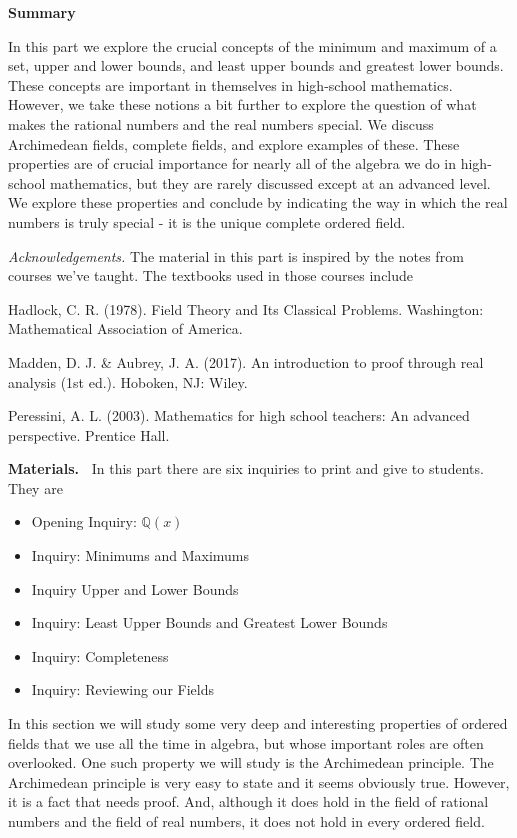 \documentclass[11pt]{article}
\newcommand\header[1]{\vspace*{4pt}\par {\large {\bf #1}}\par}
\newenvironment{bignote}[1][Instructor note]%
	{\begin{mdframed}\raggedright{\bf #1.~}}
	{\end{mdframed}}
\theoremstyle{definition}
\begin{document}
\header{Summary}

In this part we explore the crucial concepts of the minimum and maximum of a set,
upper and lower bounds, and least upper bounds and greatest lower bounds. These concepts are important
in themselves in high-school mathematics. However, we take these notions a bit further to explore
the question of what makes the rational numbers and the real numbers special.
We discuss Archimedean fields, complete fields, and explore examples of these. These properties are
of crucial importance for nearly all of the algebra we do in high-school mathematics, but they are rarely
discussed except at an advanced level. We explore these properties and conclude by indicating the way in
which the real numbers is truly special - it is the unique complete ordered field.

{\it Acknowledgements.}  The material in this part is inspired by the notes from courses we've taught. The textbooks used in those courses include

Hadlock, C. R. (1978). Field Theory and Its Classical Problems. Washington: Mathematical Association of America.

Madden, D. J. \& Aubrey, J. A. (2017). An introduction to proof through real analysis (1st ed.). Hoboken, NJ: Wiley.

Peressini, A. L. (2003). Mathematics for high school teachers: An advanced perspective. Prentice Hall.

\begin{bignote}[Materials]
  In this part there are six inquiries to print and give to students. They are
\begin{itemize}
  \item Opening Inquiry: $\mathbb{Q}(x)$
  \item Inquiry: Minimums and Maximums
  \item Inquiry Upper and Lower Bounds
  \item Inquiry: Least Upper Bounds and Greatest Lower Bounds
  \item Inquiry: Completeness
  \item Inquiry: Reviewing our Fields
\end{itemize}
\end{bignote}

In this section we will study some very deep and interesting properties of ordered fields that we use all the time in algebra, but whose important roles are often overlooked. One such
property we will study is the Archimedean principle. The Archimedean principle is very easy to state and it seems obviously true. However, it is a fact that needs proof. And, 
although it does hold in the field of rational numbers and the field of real numbers, it does not hold in every ordered field. 
\end{document}
